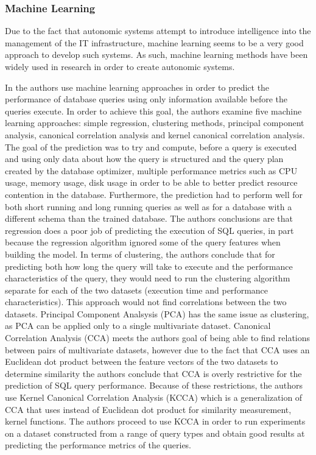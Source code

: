 \subsubsection{Machine Learning}

Due to the fact that autonomic systems attempt to introduce intelligence into the management of the IT infrastructure, machine learning seems to be a very good approach to develop such systems. As such, machine learning methods have been widely used in research in order to create autonomic systems. 

In \cite{related:mldb} the authors use machine learning approaches in order to predict the performance of database queries using only information available before the queries execute. In order to achieve this goal, the authors examine five machine learning approaches: simple regression, clustering methods, principal component analysis, canonical correlation analysis and kernel canonical correlation analysis. The goal of the prediction was to try and compute, before a query is executed and using only data about how the query is structured and the query plan created by the database optimizer, multiple performance metrics such as CPU usage, memory usage, disk usage in order to be able to better predict resource contention in the database. Furthermore, the prediction had to perform well for both short running and long running queries as well as for a database with a different schema than the trained database. The authors conclusions are that regression does a poor job of predicting the execution of SQL queries, in part because the regression algorithm ignored some of the query features when building the model. In terms of clustering, the authors conclude that for predicting both how long the query will take to execute and the performance characteristics of the query, they would need to run the clustering algorithm separate for each of the two datasets (execution time and performance characteristics). This approach would not find correlations between the two datasets. Principal Component Analsysis (PCA) has the same issue as clustering, as PCA can be applied only to a single multivariate dataset. Canonical Correlation Analysis (CCA) meets the authors goal of being able to find relations between pairs of multivariate datasets, however due to the fact that CCA uses an Euclidean dot product between the feature vectors of the two datasets to determine similarity the authors conclude that CCA is overly restrictive for the prediction of SQL query performance. Because of these restrictions, the authors use Kernel Canonical Correlation Analysis (KCCA) which is a generalization of CCA that uses instead of Euclidean dot product for similarity measurement, kernel functions. The authors proceed to use KCCA in order to run experiments on a dataset constructed from a range of query types and obtain good results at predicting the performance metrics of the queries. 

